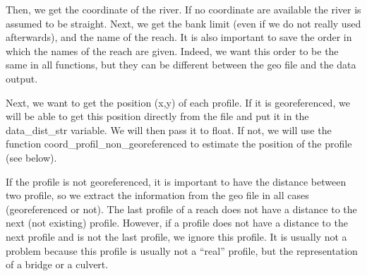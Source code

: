 \documentclass[letterpaper,10pt,english]{sphinxmanual}
\begin{document}
\begin{fulllineitems}
Then, we get the coordinate of the river. If no coordinate are available the river is assumed to be straight. Next,
we get the bank limit (even if we do not really used afterwards), and the name of the reach. It is also important
to save the order in which the names of the reach are given. Indeed, we want this order to be the same in all
functions, but they can be different between the geo file and the data output.

Next, we want to get the position (x,y) of each profile. If it is georeferenced, we will be able to get this
position directly from the file and put it in the data\_dist\_str variable. We will then pass it to float. If not,
we will use the function coord\_profil\_non\_georeferenced to estimate the position of the profile (see below).

If the profile is not georeferenced, it is important to have the distance between two profile, so we extract the
information from the geo file in all cases (georeferenced or not). The last profile of a reach does not have a
distance to the next (not existing) profile. However, if a profile does not have a distance to the next profile
and is not the last profile, we ignore this profile. It is usually not a problem because this profile is usually
not a “real” profile, but the representation of a bridge or a culvert.

\end{fulllineitems}

\end{document}
